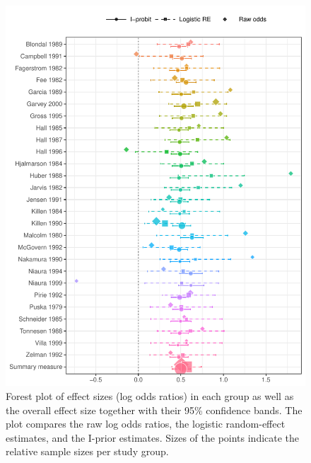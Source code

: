 \documentclass[a4paper,showframe,11pt]{report}\usepackage[]{graphicx}\usepackage[]{color}
\newenvironment{knitrout}{}{} %
\begin{document}
\begin{knitrout}
\color{fgcolor}\begin{figure}

{\centering \includegraphics[width=\linewidth]{figure/smoke_forest_plot-1} 

}

\caption[Forest plot of effect sizes (log odds ratios) in each group as well as the overall effect size together with their 95\% confidence bands]{Forest plot of effect sizes (log odds ratios) in each group as well as the overall effect size together with their 95\% confidence bands. The plot compares the raw log odds ratios, the logistic random-effect estimates, and the I-prior estimates. Sizes of the points indicate the relative sample sizes per study group.}\label{fig:smoke.forest.plot}
\end{figure}


\end{knitrout}
\end{document}
